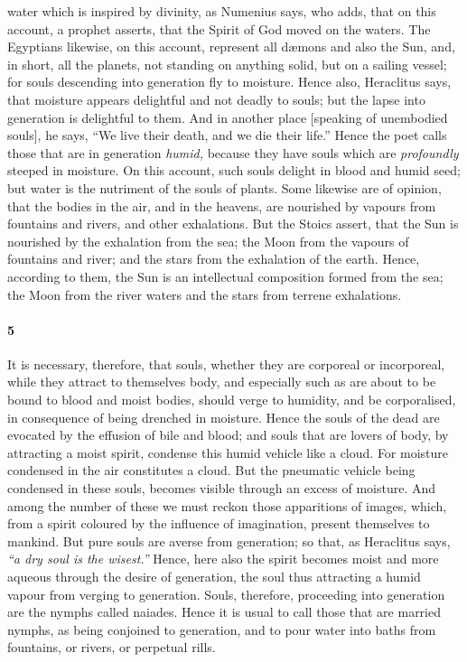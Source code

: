 \documentclass[12pt]{article}
\begin{document}
water which is inspired by divinity, as Numenius says, who adds, that on this
account, a prophet asserts, that the Spirit of God moved on the waters. The
Egyptians likewise, on this account, represent all d{\ae}mons and also the Sun,
and, in short, all the planets, not standing on anything solid, but on a
sailing vessel; for souls descending into generation fly to moisture. Hence
also, Heraclitus says, that moisture appears delightful and not deadly to
souls; but the lapse into generation is delightful to them. And in another
place [speaking of unembodied souls], he says, ``We live their death, and we
die their life.'' Hence the poet calls those that are in generation
\textit{humid,} because they have souls which are \textit{profoundly} steeped
in moisture. On this account, such souls delight in blood and humid seed; but
water is the nutriment of the souls of plants. Some likewise are of opinion,
that the bodies in the air, and in the heavens, are nourished by vapours from
fountains and rivers, and other exhalations. But the Stoics assert, that the
Sun is nourished by the exhalation from the sea; the Moon from the vapours of
fountains and river; and the stars from the exhalation of the earth. Hence,
according to them, the Sun is an intellectual composition formed from the sea;
the Moon from the river waters and the stars from terrene exhalations.


\paragraph{5} It is necessary, therefore, that souls, whether they are
corporeal or incorporeal, while they attract to themselves body, and especially
such as are about to be bound to blood and moist bodies, should verge to
humidity, and be corporalised, in consequence of being drenched in moisture.
Hence the souls of the dead are evocated by the effusion of bile and blood; and
souls that are lovers of body, by attracting a moist spirit, condense this
humid vehicle like a cloud. For moisture condensed in the air constitutes a
cloud. But the pneumatic vehicle being condensed in these souls, becomes
visible through an excess of moisture. And among the number of these we must
reckon those apparitions of images, which, from a spirit coloured by the
influence of imagination, present themselves to mankind. But pure souls are
averse from generation; so that, as Heraclitus says, \textit{``a dry soul is
the wisest.''} Hence, here also the spirit becomes moist and more aqueous
through the desire of generation, the soul thus attracting a humid vapour from
verging to generation. Souls, therefore, proceeding into generation are the
nymphs called naiades. Hence it is usual to call those that are married nymphs,
as being conjoined to generation, and to pour water into baths from fountains,
or rivers, or perpetual rills.
\end{document}
